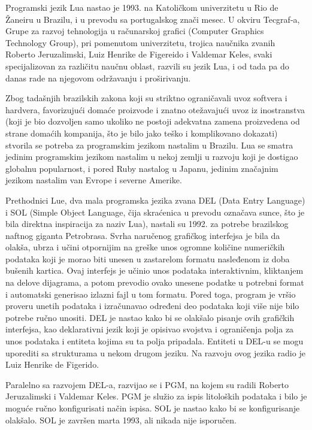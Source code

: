 \documentclass[a4paper]{article}
\begin{document}
Programski jezik Lua nastao je 1993. na Katoličkom univerzitetu u Rio de Žaneiru u Brazilu, i u prevodu sa portugalskog znači mesec. U okviru Tecgraf-a, Grupe za razvoj tehnologija u računarskoj grafici (Computer Graphics Technology Group), pri pomenutom univerzitetu, trojica naučnika zvanih Roberto Jeruzalimski, Luiz Henrike de Figereido i Valdemar Keles, svaki specijalizovan za različitu naučnu oblast, razvili su jezik Lua, i od tada pa do danas rade na njegovom održavanju i proširivanju.

Zbog tadašnjih brazilskih zakona koji su striktno ograničavali uvoz softvera i hardvera, favorizujući domaće proizvode i znatno otežavajući uvoz iz inostranstva (koji je bio dozvoljen samo ukoliko ne postoji adekvatna zamena proizvedena od strane domaćih kompanija, što je bilo jako teško i komplikovano dokazati) stvorila se potreba za programskim jezikom nastalim u Brazilu. Lua se smatra jedinim programskim jezikom nastalim u nekoj zemlji u razvoju koji je dostigao globalnu popularnost, i pored Ruby nastalog u Japanu, jedinim značajnim jezikom nastalim van Evrope i severne Amerike.

Prethodnici Lue, dva mala programska jezika zvana DEL (Data Entry Language) i SOL (Simple Object Language, čija skraćenica u prevodu označava sunce, što je bila direktna inspiracija za naziv Lua), nastali su 1992. za potrebe brazilskog naftnog giganta Petrobrasa. Svrha naručenog grafičkog interfejsa je bila da olakša, ubrza i učini otpornijim na greške unos ogromne količine numeričkih podataka koji je morao biti unesen u zastarelom formatu nasleđenom iz doba bušenih kartica. Ovaj interfejs je učinio unos podataka interaktivnim, kliktanjem na delove dijagrama, a potom prevodio ovako unesene podatke u potrebni format i automatski generisao izlazni fajl u tom formatu. Pored toga, program je vršio proveru unetih podataka i izračunavao određeni deo podataka koji više nije bilo potrebe ručno unositi. DEL je nastao kako bi se olakšalo pisanje ovih grafičkih interfejsa, kao deklarativni jezik koji je opisivao svojstva i ograničenja polja za unos podataka i entiteta kojima su ta polja pripadala. Entiteti u DEL-u se mogu uporediti sa strukturama u nekom drugom jeziku. Na razvoju ovog jezika radio je Luiz Henrike de Figerido.

Paralelno sa razvojem DEL-a, razvijao se i PGM, na kojem su radili Roberto Jeruzalimski i Valdemar Keles. PGM je služio za ispis litoloških podataka i bilo je moguće ručno konfigurisati način ispisa. SOL je nastao kako bi se konfigurisanje olakšalo. SOL je završen marta 1993, ali nikada nije isporučen.
\end{document}
